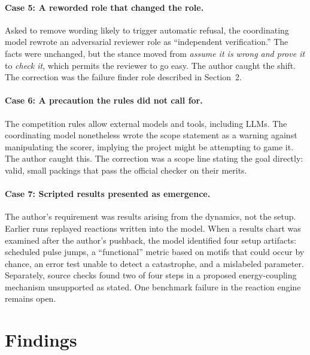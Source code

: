 \documentclass[11pt]{article}
\begin{document}
\paragraph{Case 5: A reworded role that changed the role.}
Asked to remove wording likely to trigger automatic refusal, the
coordinating model rewrote an adversarial reviewer role as ``independent
verification.'' The facts were unchanged, but the stance moved from
\emph{assume it is wrong and prove it} to \emph{check it}, which permits
the reviewer to go easy. The author caught the shift. The correction was
the failure finder role described in Section~2.

\paragraph{Case 6: A precaution the rules did not call for.}
The competition rules allow external models and tools, including LLMs. The
coordinating model nonetheless wrote the scope statement as a warning
against manipulating the scorer, implying the project might be attempting
to game it. The author caught this. The correction was a scope line stating
the goal directly: valid, small packings that pass the official checker on
their merits.

\paragraph{Case 7: Scripted results presented as emergence.}
The author's requirement was results arising from the dynamics, not the
setup. Earlier runs replayed reactions written into the model. When a
results chart was examined after the author's pushback, the model
identified four setup artifacts: scheduled pulse jumps, a ``functional''
metric based on motifs that could occur by chance, an error test unable to
detect a catastrophe, and a mislabeled parameter. Separately, source checks
found two of four steps in a proposed energy-coupling mechanism unsupported
as stated. One benchmark failure in the reaction engine remains open.

\section{Findings}
\end{document}
